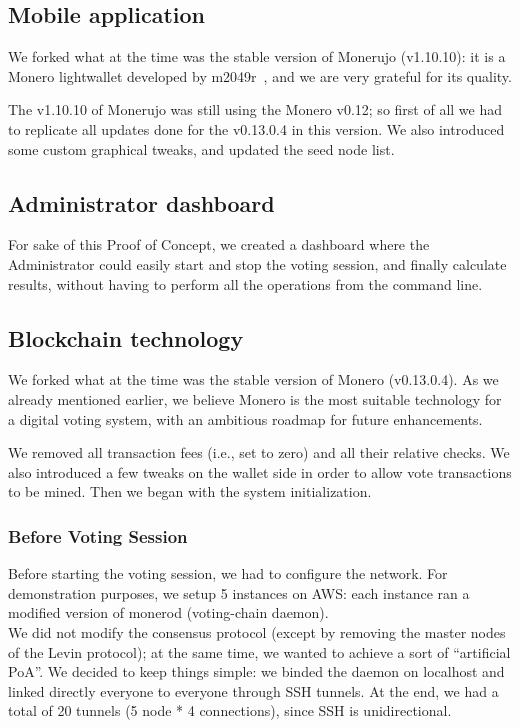 \documentclass[10pt, letterpaper]{article}
\begin{document}
\subsection{Mobile application}
We forked what at the time was the stable version of Monerujo (v1.10.10): it is a Monero lightwallet developed by m2049r~\cite{Monerujo:Online}, and we are very grateful for its quality.
\bigskip

The v1.10.10 of Monerujo was still using the Monero v0.12; so first of all we had to replicate all updates done for the v0.13.0.4 in this version. We also introduced some custom graphical tweaks, and updated the seed node list. 
\subsection{Administrator dashboard}
For sake of this Proof of Concept, we created a dashboard where the Administrator could easily start and stop the voting session, and finally calculate results, without having to perform all the operations from the command line. 
\subsection{Blockchain technology}
We forked what at the time was the stable version of Monero (v0.13.0.4). As we already mentioned earlier, we believe Monero is the most suitable technology for a digital voting system, with an ambitious roadmap for future enhancements.
\bigskip

We removed all transaction fees (i.e., set to zero) and all their relative checks. We also introduced a few tweaks on the wallet side in order to allow vote transactions to be mined. Then we began with the system initialization.
\subsubsection{Before Voting Session}
Before starting the voting session, we had to configure the network. For demonstration purposes, we setup 5 instances on AWS: each instance ran a modified version of monerod (voting-chain daemon).\\
We did not modify the consensus protocol (except by removing the master nodes of the Levin protocol); at the same time, we wanted to achieve a sort of “artificial PoA”. We decided to keep things simple: we binded the daemon on localhost and linked directly everyone to everyone through SSH tunnels. At the end, we had a total of 20 tunnels (5 node * 4 connections), since SSH is unidirectional.
\bigskip
\end{document}
